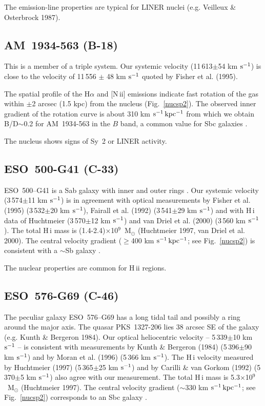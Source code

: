 The  emission-line  properties are typical for LINER nuclei (e.g.  Veilleux
\& Osterbrock 1987).

\subsection{AM~1934-563 (B-18)}

This is a member of a triple system.  Our systemic velocity (11\,613$\pm$54
km $\rm  s^{-1}$)  is close to the  velocity  of  11\,556  $\pm$ 48 km $\rm
s^{-1}$ quoted by Fisher et al.  (1995).

The spatial  profile of the H$\alpha$ and [N\,{\sc ii}] emissions  indicate
fast  rotation of the gas within  $\pm$2  arcsec (1.5 kpc) from the nucleus
(Fig.~\ref{nucsp2}).  The observed inner gradient of the rotation  curve is
about 310 km $\rm  s^{-1}\,kpc^{-1}$  from which we obtain B/D$\sim$0.2 for
AM~1934-563 in the $B$ band, a common value for Sbc galaxies \cite{sv}.

The nucleus shows signs of Sy~2 or LINER activity.

\subsection{ESO~500-G41 (C-33)}

ESO~500--G41  is a Sab galaxy  with inner and outer  rings  \cite{bu}.  Our
systemic  velocity  (3\,574$\pm$11  km $\rm  s^{-1}$) is in agreement  with
optical  measurements  by  Fisher  et al.  (1995)  (3\,532$\pm$20  km  $\rm
s^{-1}$), Fairall et al.  (1992)  (3\,541$\pm$29  km $\rm s^{-1}$) and with
H\,{\sc  i}  data  of  Huchtmeier    (3\,570$\pm$12  km  $\rm
s^{-1}$) and van Driel et al.  (2000) (3\,560 km $\rm  s^{-1}$).  The total
H\,{\sc i} mass is  (1.4-2.4)$\times$10$^9$~M$_{\odot}$  (Huchtmeier  1997,
van Driel et al.  2000).  The central velocity gradient  ($\geq$400 km $\rm
s^{-1}\,kpc^{-1}$;  see  Fig.~\ref{nucsp2})  is consistent  with a $\sim$Sb
galaxy \cite{mmm}.

The nuclear properties are common for H\,{\sc ii} regions.

\subsection{ESO~576-G69 (C-46)}

The peculiar galaxy  ESO~576--G69 has a long tidal tail and possibly a ring
around the major  axis.  The quasar  PKS~1327-206  lies 38 arcsec SE of the
galaxy (e.g.  Kunth \& Bergeron 1984).  Our optical  heliocentric  velocity
--  5\,339$\pm$10  km $\rm s^{-1}$ -- is consistent  with  measurements  by
Kunth \& Bergeron  (1984)  (5\,396$\pm$90  km $\rm s^{-1}$) and by Moran et
al.  (1996) (5\,366 km $\rm s^{-1}$).  The H\,{\sc i} velocity  measured by
Huchtmeier  (1997)  (5\,365$\pm$25  km $\rm  s^{-1}$) and by Carilli \& van
Gorkom  (1992)   (5\,370$\pm$5   km  $\rm  s^{-1}$)  also  agree  with  our
measurement.  The total  H\,{\sc  i} mass is  5.3$\times$10$^9$~M$_{\odot}$
(Huchtmeier  1997).  The  central  velocity  gradient  ($\sim$330  km  $\rm
s^{-1}\,kpc^{-1}$;  see  Fig.~\ref{nucsp2})  corresponds  to an Sbc  galaxy
\cite{mmm}.

